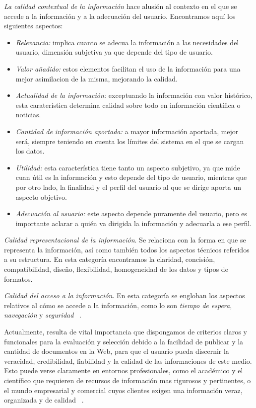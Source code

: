 \emph{La calidad contextual de la informaci\'on} hace alusi\'on al contexto en el que se accede a la informaci\'on y a la adecuaci\'on del usuario. Encontramos aqu\'i los siguientes aspectos:
\begin{itemize}
\item \emph{Relevancia:} implica cuanto se adecua la informaci\'on a las necesidades del usuario, dimensi\'on subjetiva ya que depende del tipo de usuario.
\item \emph{Valor a\~nadido:} estos elementos facilitan el uso de la informaci\'on para una mejor asimilacion de la misma, mejorando la calidad.
\item \emph{Actualidad de la informaci\'on:} exceptuando la informaci\'on con valor hist\'orico, esta carater\'istica determina calidad sobre todo en informaci\'on cient\'ifica o noticias.
\item \emph{Cantidad de informaci\'on aportada:} a mayor informaci\'on aportada, mejor ser\'a, siempre teniendo en cuenta los l\'imites del sistema en el que se cargan los datos.
\item \emph{Utilidad:} esta caracter\'istica tiene tanto un aspecto subjetivo, ya que mide cuan \'util es la informaci\'on y esto depende del tipo de usuario, mientras que por otro lado, la finalidad y el perfil del usuario al que se dirige aporta un aspecto objetivo.
\item \emph{Adecuaci\'on al usuario:} este aspecto depende puramente del usuario, pero es importante aclarar a qui\'en va dirigida la informaci\'on y adecuarla a ese perfil.
\end{itemize}

\emph{Calidad representacional de la informaci\'on}. Se relaciona con la forma en que se representa la informaci\'on, as\'i como tambi\'en todos los aspectos t\'ecnicos referidos a su estructura. En esta categor\'ia encontramos la claridad, concisi\'on, compatibilidad, dise\~no, flexibilidad, homogeneidad de los datos y tipos de formatos.

\emph{Calidad del acceso a la informaci\'on}. En esta categor\'ia se engloban los aspectos relativos al c\'omo se accede a la informaci\'on, como lo son \emph{tiempo de espera}, \emph{navegaci\'on} y \emph{seguridad} ~\cite{MaPiMo:11}.

Actualmente, resulta de vital importancia que dispongamos de criterios claros y funcionales para la evaluaci\'on y selecci\'on debido a la facilidad de publicar y la cantidad de documentos en la Web, para que el usuario  pueda discernir la veracidad, credibilidad, fiabilidad y la calidad de las informaciones de este medio. Esto puede verse claramente en entornos profesionales, como el acad\'emico y el cient\'ifico que requieren de recursos de informaci\'on mas rigurosos y pertinentes, o el mundo empresarial y comercial cuyos clientes exigen una informaci\'on veraz, organizada y de calidad ~\cite{MaPiMo:11}.

